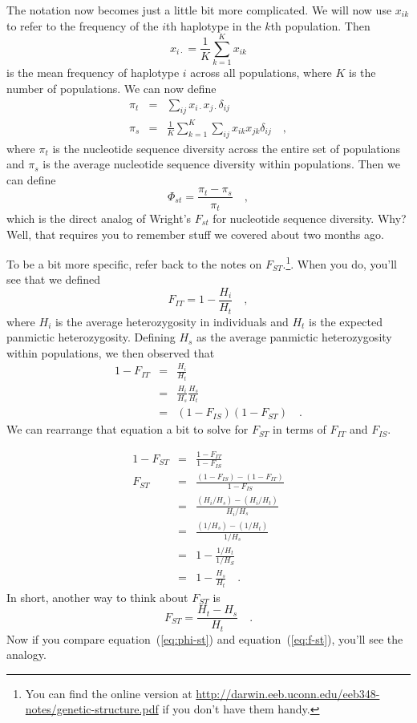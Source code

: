 \documentclass[12pt]{article}
\begin{document}
The notation now becomes just a little bit more complicated. We will
now use $x_{ik}$ to refer to the frequency of the $i$th haplotype in
the $k$th population. Then
\[
x_{i\cdot} = \frac{1}{K}\sum_{k=1}^K x_{ik}
\]
is the mean frequency of haplotype $i$ across all populations, where
$K$ is the number of populations. We can now define
\begin{eqnarray*}
\pi_t &=& \sum_{ij} x_{i\cdot}x_{j\cdot} \delta_{ij} \\
\pi_s &=& \frac{1}{K}\sum_{k=1}^K\sum_{ij} x_{ik}x_{jk}\delta_{ij} \quad ,
\end{eqnarray*}
where $\pi_t$ is the nucleotide sequence diversity across the entire
set of populations and $\pi_s$ is the average nucleotide sequence
diversity within populations. Then we can define
\begin{equation}
\Phi_{st} = \frac{\pi_t - \pi_s}{\pi_t} \quad ,
\label{eq:phi-st}
\end{equation}
which is the direct analog of Wright's $F_{st}$ for nucleotide
sequence diversity. Why? Well, that requires you to remember stuff we
covered about two months ago.

To be a bit more specific, refer back to the 
notes on $F_{ST}$.\footnote{You can find the online version at
  \url{http://darwin.eeb.uconn.edu/eeb348-notes/genetic-structure.pdf}
  if you don't have them handy.}.
When you do, you'll see that we defined
\[
F_{IT} = 1 - \frac{H_i}{H_t} \quad ,
\]
where $H_i$ is the average heterozygosity in individuals and $H_t$ is
the expected panmictic heterozygosity. Defining $H_s$ as the average
panmictic heterozygosity within populations, we then observed that
\begin{eqnarray*}
1 - F_{IT} &=& \frac{H_i}{H_t} \\
           &=& \frac{H_i}{H_s}\frac{H_s}{H_t} \\
           &=& (1 - F_{IS})(1 - F_{ST}) \quad .
\end{eqnarray*}
We can rearrange that equation a bit to solve for $F_{ST}$ in terms of
$F_{IT}$ and $F_{IS}$.

\begin{eqnarray*}
1-F_{ST} &=& \frac{1-F_{IT}}{1-F_{IS}} \\
F_{ST} &=&
\frac{\left(1-F_{IS}\right)-\left(1-F_{IT}\right)}{1-F_{IS}} \\
&=& \frac{\left(H_i/H_s\right) - \left(H_i/H_t\right)}{H_i/H_s} \\
&=& \frac{\left(1/H_s\right) - \left(1/H_t\right)}{1/H_s} \\
&=& 1 - \frac{1/H_t}{1/H_S} \\  
&=& 1 - \frac{H_s}{H_t} \quad .
\end{eqnarray*}
In short, another way to think about $F_{ST}$ is
\begin{equation}
F_{ST} = \frac{H_t - H_s}{H_t} \quad .
\label{eq:f-st}
\end{equation}
Now if you compare equation~(\ref{eq:phi-st}) and
equation~(\ref{eq:f-st}), you'll see the analogy.
\end{document}
